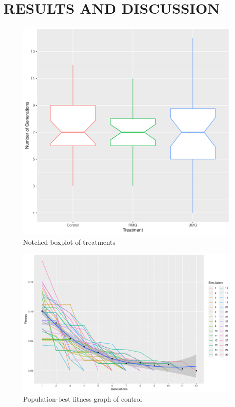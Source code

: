 \documentclass{strrespaper-trad}
\begin{document}
	\chapter{RESULTS AND DISCUSSION}
		\begin{figure}[htbp]
			\centering
			\includegraphics[width=\textwidth]{../figures/boxplot}
			\caption{Notched boxplot of treatments}
			\label{fig:boxplot}
		\end{figure}
		\begin{figure}[htbp]
			\centering
			\includegraphics[width=\textwidth]{../figures/ctrl_ftrack}
			\caption{Population-best fitness graph of control}
			\label{fig:fitgraph_ctrl}
		\end{figure}
\end{document}
